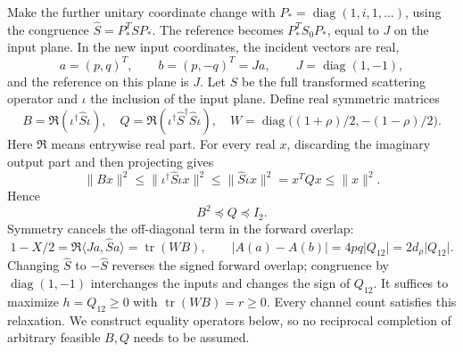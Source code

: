 \documentclass[11pt,a4paper]{article}
\theoremstyle{remark}
\newcommand{\norm}[1]{\lVert #1\rVert}
\newcommand{\abs}[1]{\lvert #1\rvert}
\newcommand{\ip}[2]{\langle #1,#2\rangle}
\newcommand{\tr}{\operatorname{tr}}
\newcommand{\diag}{\operatorname{diag}}
\begin{document}
Make the further unitary coordinate change with $P_*=\diag(1,i,1,\ldots)$, using the congruence $\widehat S=P_*^TSP_*$. The reference becomes $P_*^TS_0P_*$, equal to $J$ on the input plane. In the new input coordinates, the incident vectors are real,
\[
 a=(p,q)^T,\qquad b=(p,-q)^T=J a,\qquad J=\diag(1,-1),
\]
and the reference on this plane is $J$. Let $\widehat S$ be the full transformed scattering operator and $\iota$ the inclusion of the input plane. Define real symmetric matrices
\begin{equation}\label{eq:compression}
 B=\Re(\iota^\dagger\widehat S\iota),\quad
 Q=\Re(\iota^\dagger\widehat S^\dagger\widehat S\iota),\quad
 W=\diag\bigl((1+\rho)/2,-(1-\rho)/2\bigr).
\end{equation}
Here $\Re$ means entrywise real part. For every real $x$, discarding the imaginary output part and then projecting gives
\[
 \norm{Bx}^2\leq\norm{\iota^\dagger\widehat S\iota x}^2
 \leq\norm{\widehat S\iota x}^2=x^TQx\leq\norm x^2.
\]
Hence
\begin{equation}\label{eq:relaxation}
 B^2\preceq Q\preceq I_2.
\end{equation}
Symmetry cancels the off-diagonal term in the forward overlap:
\[
 1-X/2=\Re\ip{Ja}{\widehat Sa}=\tr(WB),\qquad
 \abs{A(a)-A(b)}=4pq\abs{Q_{12}}=2d_\rho\abs{Q_{12}}.
\]
Changing $\widehat S$ to $-\widehat S$ reverses the signed forward overlap; congruence by $\diag(1,-1)$ interchanges the inputs and changes the sign of $Q_{12}$. It suffices to maximize $h=Q_{12}\geq0$ with $\tr(WB)=r\geq0$. Every channel count satisfies this relaxation. We construct equality operators below, so no reciprocal completion of arbitrary feasible $B,Q$ needs to be assumed.
\end{document}
